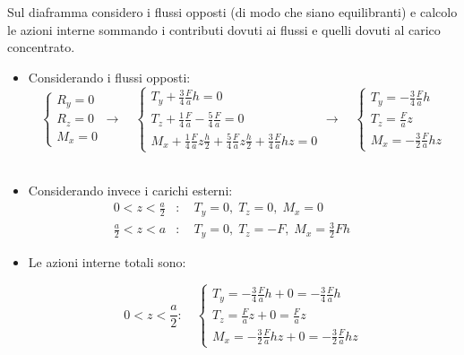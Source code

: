 \begin{esempioBox}
    Sul diaframma considero i flussi opposti (di modo che siano equilibranti) e calcolo le azioni interne sommando i contributi dovuti ai flussi e quelli dovuti al carico concentrato.
    \begin{itemize}
        \item Considerando i flussi opposti:
        \begin{equation*}
            \begin{cases}
                R_y=0\\R_z=0\\M_x=0
            \end{cases}
            \rightarrow\quad
            \begin{cases}
                T_y+\frac{3}{4}\frac{F}{a} h=0\\
                T_z +\frac{1}{4}\frac{F}{a}    -\frac{5}{4}\frac{F}{a} =0\\
                M_x +\frac{1}{4}\frac{F}{a} z\frac{h}{2} + \frac{5}{4}\frac{F}{a}z\frac{h}{2} +\frac{3}{4}\frac{F}{a}hz=0
            \end{cases}
            \rightarrow\quad
            \begin{cases}
                T_y =-\frac{3}{4}\frac{F}{a}h\\
                T_z  =\frac{F}{a}  z\\
                M_x = - \frac{3}{2}\frac{F}{a}hz
            \end{cases}
        \end{equation*}\\
        \item Considerando invece i carichi esterni:
        \begin{align*}
    0<z<\frac{a}{2}&: \quad T_y = 0, \; T_z = 0, \; M_x = 0 
    \qquad\qquad\\
    \frac{a}{2}<z<a&: \quad T_y = 0, \; T_z = -F, \; M_x = \frac{3}{2}Fh
\end{align*}
\item Le azioni interne totali sono:


\begin{equation*}
    0<z<\frac{a}{2}: \quad 
    \begin{cases}
        T_y = -\frac{3}{4}\frac{F}{a}h + 0 = -\frac{3}{4}\frac{F}{a}h \\
        T_z = \frac{F}{a}z + 0 = \frac{F}{a}z \\
        M_x = -\frac{3}{2}\frac{F}{a}hz + 0 = -\frac{3}{2}\frac{F}{a}hz
    \end{cases}
\end{equation*}


\end{itemize}
\end{esempioBox}
